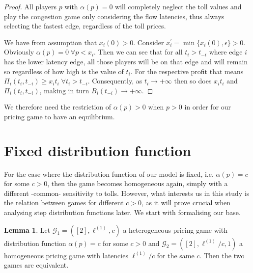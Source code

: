 \documentclass[10pt,a4paper]{book}
\newcommand{\Gm}{\mathcal{G}}
\theoremstyle{definition}
\newtheorem{lemma}[definition]{Lemma}
\theoremstyle{comment}
\begin{document}
\begin{proof}
	All players $p$ with $\alpha(p) = 0$ will completely neglect the toll values and play the congestion game only considering the flow latencies, thus always selecting the fastest edge, regardless of the toll prices.

	We have from assumption that $x_i(0) > 0$.
	Consider $x_i^\prime = \min\{x_i(0), \epsilon\} > 0$.
	Obviously $\alpha(p) = 0 \; \forall p < x_i$.
	Then we can see that for all $t_i > t_{-i}$ where edge $i$ has the lower latency edge, all those players will be on that edge and will remain so regardless of how high is the value of $t_i$.
	For the respective profit that means $\Pi_i(t_i, t_{-i}) \ge x_i t_i \; \forall t_i > t_{-i}$.
	Consequently, as $t_i \rightarrow +\infty$ then so does $x_i t_i$ and $\Pi_i(t_i, t_{-i})$, making in turn $B_i(t_{-i}) \rightarrow +\infty$.
\end{proof}
We therefore need the restriction of $\alpha(p) > 0$ when $p > 0$ in order for our pricing game to have an equilibrium.

\section{Fixed distribution function}

For the case where the distribution function of our model is fixed, i.e. $\alpha(p) = c$ for some $c > 0$, then the game becomes homogeneous again, simply with a different -common- sensitivity to tolls.
However, what interests us in this study is the relation between games for different $c > 0$, as it will prove crucial when analysing step distribution functions later.
We start with formalising our base.

\begin{lemma}
	\label{lemma:a_fixed_homogeneous}
	Let $\Gm_1 = ([2], \ell^{(1)}, c)$ a heterogeneous pricing game with distribution function $\alpha(p) = c$ for some $c > 0$ and $\Gm_2 = ([2], \ell^{(1)} / c, 1)$ a homogeneous pricing game with latencies $\ell^{(1)} / c$ for the same $c$.
	Then the two games are equivalent.
\end{lemma}
\end{document}
